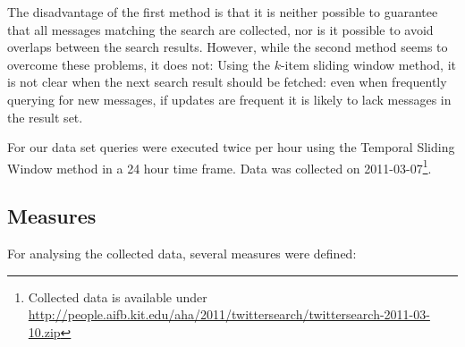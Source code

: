 \documentclass{llncs}
\begin{document}
The disadvantage of the first method is that it is neither possible to guarantee that all messages matching the search are collected, nor is it possible to avoid overlaps between the search results. However, while the second method seems to overcome these problems, it does not: Using the $k$-item sliding window method, it is not clear when the next search result should be fetched: even when frequently querying for new messages, if updates are frequent it is likely to lack messages in the result set.

For our data set queries were executed twice per hour using the Temporal
Sliding Window method in a 24 hour time frame. Data was
collected on 2011-03-07\footnote{Collected data is available under
\url{http://people.aifb.kit.edu/aha/2011/twittersearch/twittersearch-2011-03-10.zip}}.

\subsection{Measures}

For analysing the collected data, several measures were defined:
\end{document}

